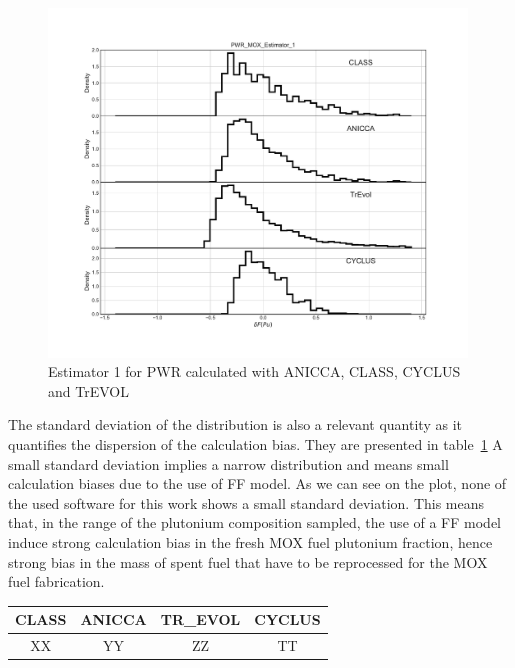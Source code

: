 \begin{figure}[h]
	\begin{center}
		\includegraphics[width = 0.99\textwidth]{../../Feature_1/RAW_DATA/FIG/PWR_MOX_Estimator_1.pdf}
		\caption{Estimator 1 for PWR calculated with ANICCA, CLASS, CYCLUS and TrEVOL}
		\label{fig:Est1_PWR}
	\end{center}
\end{figure}

The standard deviation of the distribution is also a relevant quantity as it
quantifies the dispersion of the calculation bias. They are presented in
table~\ref{table:Est1_PWR} A small standard deviation implies a narrow
distribution and means small calculation biases due to the use of FF model. As
we can see on the plot, none of the used software for this work shows a small
standard deviation. This means that, in the range of the plutonium composition
sampled, the use of a FF model induce strong calculation bias in the fresh MOX
fuel plutonium fraction, hence strong bias in the mass of spent fuel that have
to be reprocessed for the MOX fuel fabrication.

\begin{table}[h]
	\begin{center}
		\begin{tabular}{|c||c||c||c|}
			\hline 
				CLASS & ANICCA & TR\_EVOL & CYCLUS \\
			\hline
				XX & YY & ZZ & TT \\
		\end{tabular}
	\end{center}
	\label{table:Est1_PWR}
\end{table}

